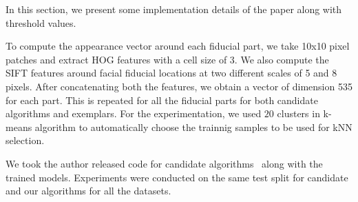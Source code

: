 \label{subsec:implementation_details}

In this section, we present some implementation details of the paper along with threshold values.

To compute the appearance vector around each fiducial part, we take 10x10 pixel patches and extract 
HOG features with a cell size of 3. We also compute the SIFT features around facial fiducial 
locations at two different scales of 5 and 8 pixels. After concatenating both the features, we obtain a 
vector of dimension 535 for each part. This is repeated for all the fiducial parts for both
candidate algorithms and exemplars.
% 
For the experimentation, we used $20$ clusters in k-means algorithm to automatically choose the
trainnig samples to be used for kNN selection. 

We took the author released code for candidate algorithms~\cite{xhuCVPR12_wild, xiongCVPR13_SDM,  
artizzzuICCV13_COFW, asthanaCVPR14_Chehra, Tzimiropoulos_2015_CVPR} along with the trained models. Experiments were conducted
on the same test split for candidate and our algorithms for all the datasets.
